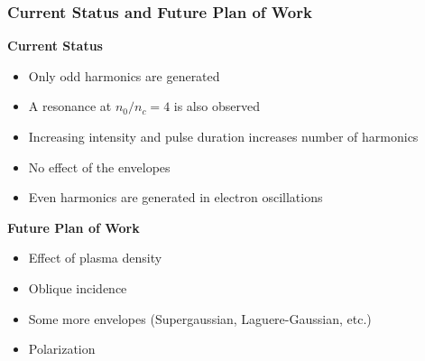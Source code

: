 \documentclass{beamer}
\begin{document}
\begin{frame}
    \frametitle{Current Status and Future Plan of Work}
    \textbf{Current Status}
    \begin{itemize}
        \item Only odd harmonics are generated
        \item A resonance at $n_0/n_c=4$ is also observed
        \item Increasing intensity and pulse duration increases number of harmonics
        \item No effect of the envelopes
        \item Even harmonics are generated in electron oscillations
    \end{itemize}
    \textbf{Future Plan of Work}
    \begin{itemize}
        \item Effect of plasma density
        \item Oblique incidence
        \item Some more envelopes (Supergaussian, Laguere-Gaussian, etc.)
        \item Polarization
    \end{itemize}
\end{frame}

\end{document}

